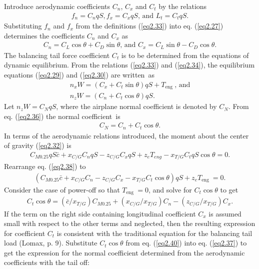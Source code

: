 \documentclass{AeroStructure-ERJohnson}
\begin{document}
Introduce aerodynamic coefficients $C_{n}$, $C_{x}$ and $C_{t}$ by the relations
\begin{align}\label{eq2.33}
f_{n}=C_{n} q S, f_{x}=C_{x} q S\mbox{,  and }L_{t}=C_{t} q S.
\end{align}
Substituting $f_{n}$ and $f_{x}$ from the definitions (\ref{eq2.33}) into eq. (\ref{eq2.27}) determines the coefficients $C_{n}$ and $C_{x}$ as
\begin{align}\label{eq2.34}
C_{n}=C_{L} \cos \theta+C_{D} \sin \theta\mbox{, and }C_{x}=C_{L} \sin \theta-C_{D} \cos \theta.
\end{align}
The balancing tail force coefficient $C_{t}$ is to be determined from the equations of dynamic equilibrium. From the relations (\ref{eq2.33}) and (\ref{eq2.34}), the equilibrium equations (\ref{eq2.29}) and (\ref{eq2.30}) are written~as
\begin{align}\label{eq2.35}
n_{x} W=\left(C_{x}+C_{t} \sin \theta\right) q S+T_{\text {eng }}\mbox{, and}\\
n_{z} W=\left(C_{n}+C_{t} \cos \theta\right) q S.\label{eq2.36}
\end{align}
Let $n_{z} W=C_{N} q S$, where the airplane normal coefficient is denoted by $C_{N}$. From eq. (\ref{eq2.36}) the normal coefficient~is
\begin{align}\label{eq2.37}
C_{N}=C_{n}+C_{t} \cos \theta.
\end{align}
In terms of the aerodynamic relations introduced, the moment about the center of gravity (\ref{eq2.32}) is
\begin{align}\label{eq2.38}
C_{M 0.25} q S \bar{c}+x_{C/G} C_{n} q S-z_{C/G} C_{x} q S+z_{e} T_{e n g}-x_{T/G} C_{t} q S \cos \theta=0.
\end{align}
Rearrange eq. (\ref{eq2.38}) to
\begin{align}\label{eq2.39}
(C_{M 0.25} \bar{c}+x_{C/G} C_{n}-z_{C/G} C_{x}-x_{T/G} C_{t} \cos \theta) q S+z_{e} T_{\text {eng }}=0.
\end{align}
Consider the case of power-off so that $T_{\text {eng }}=0$, and solve for $C_{t} \cos \theta$ to get
\begin{align}\label{eq2.40}
C_{t} \cos \theta=(\bar{c}/x_{T/G}) C_{M 0.25}+(x_{C/G}/x_{T/G}) C_{n}-(z_{C/G}/x_{T/G}) C_{x}.
\end{align}
If the term on the right side containing longitudinal coefficient $C_{x}$ is assumed small with respect to the other terms and neglected, then the resulting expression for coefficient $C_{t}$ is consistent with the traditional equation for the balancing tail load (Lomax, p. 9). Substitute $C_{t} \cos \theta$ from eq. (\ref{eq2.40}) into eq. (\ref{eq2.37}) to get the expression for the normal coefficient determined from the aerodynamic coefficients with the tail off:
\end{document}
